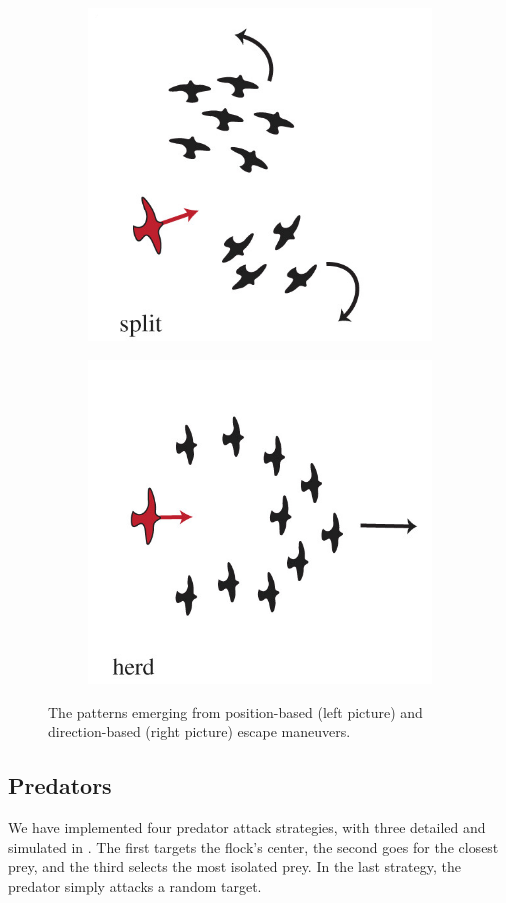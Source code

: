 \documentclass[9pt]{pnas-new}
\begin{document}
\begin{figure}[h]
	\centering
	\begin{subfigure}[t]{.45\textwidth}
		\centering
		\includegraphics[width=0.6\linewidth]{article_split.png}
	\end{subfigure}%
	\hspace{.5cm} %
	\begin{subfigure}[t]{.45\textwidth}
		\centering
		\includegraphics[width=0.6\linewidth]{article_herd.png}
	\end{subfigure}
	\caption{The patterns emerging from position-based (left picture) and direction-based (right picture) escape maneuvers.}
	\label{fig:escape_maneuvers}
\end{figure}

\subsection*{Predators}

We have implemented four predator attack strategies, with three detailed and simulated in \cite{JDemsar_predator_attacks}.
The first targets the flock's center,
the second goes for the closest prey,
and the third selects the most isolated prey.
In the last strategy, the predator simply attacks a random target.
\end{document}
